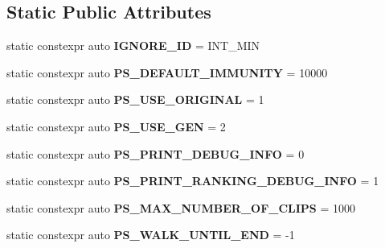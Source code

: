 \subsection*{Static Public Attributes}
\begin{DoxyCompactItemize}
\item 
static constexpr auto {\bfseries I\+G\+N\+O\+R\+E\+\_\+\+ID} = I\+N\+T\+\_\+\+M\+IN\hypertarget{classkukadu_1_1ProjectiveSimulator_aca61d0fef4c6b66880d901dee5d013e1}{}\label{classkukadu_1_1ProjectiveSimulator_aca61d0fef4c6b66880d901dee5d013e1}

\item 
static constexpr auto {\bfseries P\+S\+\_\+\+D\+E\+F\+A\+U\+L\+T\+\_\+\+I\+M\+M\+U\+N\+I\+TY} = 10000\hypertarget{classkukadu_1_1ProjectiveSimulator_abd06bd43a4a3f8fb07ac2d5cd2b65c8f}{}\label{classkukadu_1_1ProjectiveSimulator_abd06bd43a4a3f8fb07ac2d5cd2b65c8f}

\item 
static constexpr auto {\bfseries P\+S\+\_\+\+U\+S\+E\+\_\+\+O\+R\+I\+G\+I\+N\+AL} = 1\hypertarget{classkukadu_1_1ProjectiveSimulator_a34d27d64db9a7784f2a1e6bb384fbebf}{}\label{classkukadu_1_1ProjectiveSimulator_a34d27d64db9a7784f2a1e6bb384fbebf}

\item 
static constexpr auto {\bfseries P\+S\+\_\+\+U\+S\+E\+\_\+\+G\+EN} = 2\hypertarget{classkukadu_1_1ProjectiveSimulator_aa3c0938e8baabba18467af36f47f4e59}{}\label{classkukadu_1_1ProjectiveSimulator_aa3c0938e8baabba18467af36f47f4e59}

\item 
static constexpr auto {\bfseries P\+S\+\_\+\+P\+R\+I\+N\+T\+\_\+\+D\+E\+B\+U\+G\+\_\+\+I\+N\+FO} = 0\hypertarget{classkukadu_1_1ProjectiveSimulator_a8cb8845bbc8f20498f708fac575d7d79}{}\label{classkukadu_1_1ProjectiveSimulator_a8cb8845bbc8f20498f708fac575d7d79}

\item 
static constexpr auto {\bfseries P\+S\+\_\+\+P\+R\+I\+N\+T\+\_\+\+R\+A\+N\+K\+I\+N\+G\+\_\+\+D\+E\+B\+U\+G\+\_\+\+I\+N\+FO} = 1\hypertarget{classkukadu_1_1ProjectiveSimulator_a451e306dd5587b68fcd90a9e43dac576}{}\label{classkukadu_1_1ProjectiveSimulator_a451e306dd5587b68fcd90a9e43dac576}

\item 
static constexpr auto {\bfseries P\+S\+\_\+\+M\+A\+X\+\_\+\+N\+U\+M\+B\+E\+R\+\_\+\+O\+F\+\_\+\+C\+L\+I\+PS} = 1000\hypertarget{classkukadu_1_1ProjectiveSimulator_ad21dc772fd571626d7fad31ff251e0a5}{}\label{classkukadu_1_1ProjectiveSimulator_ad21dc772fd571626d7fad31ff251e0a5}

\item 
static constexpr auto {\bfseries P\+S\+\_\+\+W\+A\+L\+K\+\_\+\+U\+N\+T\+I\+L\+\_\+\+E\+ND} = -\/1\hypertarget{classkukadu_1_1ProjectiveSimulator_a972c03f7b17fc7f38e676919bb16609a}{}\label{classkukadu_1_1ProjectiveSimulator_a972c03f7b17fc7f38e676919bb16609a}

\end{DoxyCompactItemize}


